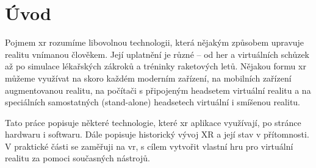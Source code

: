 \chapter*{Úvod}

Pojmem \gls{xr} rozumíme libovolnou technologii, která nějakým způsobem upravuje realitu vnímanou člověkem. Její uplatnění je různé -- od her a virtuálních schůzek až po simulace lékařských zákroků a tréninky raketových letů. \cite{muni_kybernetika} Nějakou formu \gls{xr} můžeme využívat na skoro každém moderním zařízení, na mobilních zařízení augmentovanou realitu, na počítači s připojeným headsetem virtuální realitu a na speciálních samostatných (stand-alone) headsetech virtuální i smíšenou realitu. 

Tato práce popisuje některé technologie, které \gls{xr} aplikace využívají, po stránce hardwaru i softwaru. Dále popisuje historický vývoj XR a její stav v přítomnosti. V praktické části se zaměřuji na \gls{vr}, s cílem vytvořit vlastní hru pro virtuální realitu za pomoci současných nástrojů.
